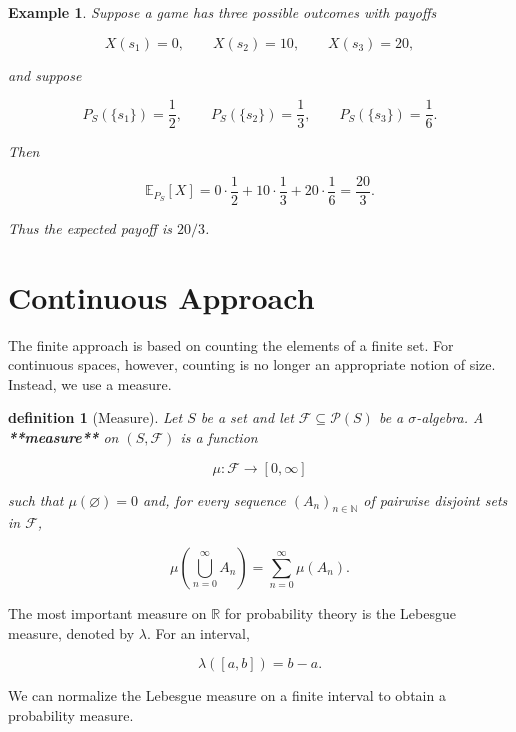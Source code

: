 \documentclass[10pt,a4paper]{book}
\newtheorem{definition}{definition}[section]
\newtheorem{example}{Example}[section]
\begin{document}
\begin{example}

    Suppose a game has three possible outcomes with payoffs

    $$
        X(s_1)=0,\qquad X(s_2)=10,\qquad X(s_3)=20,
    $$

    and suppose

    $$
        P_S(\{s_1\})=\frac12,\qquad
        P_S(\{s_2\})=\frac13,\qquad
        P_S(\{s_3\})=\frac16.
    $$

    Then

    $$
        \mathbb E_{P_S}[X]
        =
        0\cdot\frac12
        +
        10\cdot\frac13
        +
        20\cdot\frac16
        =
        \frac{20}{3}.
    $$

    Thus the expected payoff is $20/3$.
\end{example}



\section{Continuous Approach}

The finite approach is based on counting the elements of a finite set. For continuous spaces, however, counting is no longer an appropriate notion of size. Instead, we use a measure.

\begin{definition}[Measure]

    Let $S$ be a set and let $\mathcal F\subseteq\mathcal P(S)$ be a $\sigma$-algebra. A \textbf{**measure**} on $(S,\mathcal F)$ is a function

    $$
        \mu:\mathcal F\to[0,\infty]
    $$

    such that $\mu(\varnothing)=0$ and, for every sequence $(A_n)_{n\in\mathbb N}$ of pairwise disjoint sets in $\mathcal F$,

    $$
        \mu\left(\bigcup_{n=0}^{\infty}A_n\right)
        =
        \sum_{n=0}^{\infty}\mu(A_n).
    $$

\end{definition}



The most important measure on $\mathbb R$ for probability theory is the Lebesgue measure, denoted by $\lambda$. For an interval,

$$
    \lambda([a,b])=b-a.
$$

We can normalize the Lebesgue measure on a finite interval to obtain a probability measure.
\end{document}
